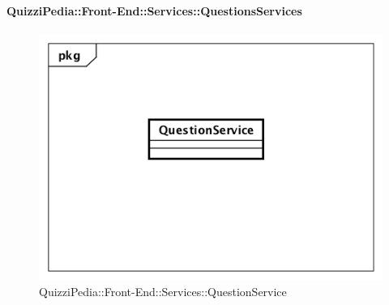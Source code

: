 \paragraph{QuizziPedia::Front-End::Services::QuestionsServices}
\begin{figure}
	\centering
	\includegraphics[scale=0.45]{UML/Classi/Front-End/QuizziPedia_Front-end_Services_ QuestionService.png}
	\caption{QuizziPedia::Front-End::Services::QuestionService}
\end{figure}
